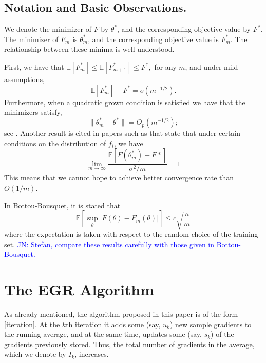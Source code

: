 \documentclass[11pt]{article}
\begin{document}
\subsection{Notation and Basic Observations.}
We denote the minimizer of $F$ by $\theta^*$, and the corresponding objective value by $F^*$.  
The minimizer of $F_m$ is $\theta^*_m$, and the corresponding objective value is $F^*_m$.  The relationship between these minima is well understood.

First, we have \cite[Proposition 10]{Kim:2015aa}  that 
$
         \mathbb{E} [F^*_m] \leq \mathbb{E} [F^*_{m+1}] \leq F^* ,
$
for any $m$, and under mild assumptions,
\[
         \mathbb{E} [ F^*_m ]-F^* = o(m^{-1/2}).
 \]
Furthermore, when a quadratic grown condition is satisfied we have that the minimizers satisfy,
\[ 
        \| \theta^*_m-\theta^*\| = O_p(m^{-1/2});
 \]
see \cite[Theorem 12]{Kim:2015aa}. Another result is cited in papers such as \cite{Frostig:2014aa} that state that under certain conditions on the distribution of $f_i$, we have 
\begin{equation}  \label{inc}
	\lim_{m \rightarrow \infty} \frac{\mathbb{E} \left[ F(\theta^*_m) - F*  \right] }{\sigma^2/m} = 1
\end{equation}
This means that we cannot hope to achieve better convergence rate than $O(1/m)$.

In Bottou-Bousquet\cite{bottou-bousquet-2008b}, it is stated that 
\begin{equation}
	\mathbb{E} \left[ \sup_{\theta} | F(\theta) - F_m(\theta) | \right] \leq c \sqrt{\frac{n}{m}}
\end{equation}
where the expectation is taken with respect to the random choice of the training set. 
\textcolor{blue}{JN: Stefan, compare these results carefully with those given in Bottou-Bousquet.}





\section{The EGR Algorithm}


As already mentioned, the algorithm proposed in this paper is of the form \eqref{iteration}. At the $k$th iteration it adds some (say, $u_k$) new sample gradients to the running average, and at the same time, updates some (say, $s_k$) of the gradients previously stored. Thus, the total number of  gradients in the average, which we denote by $I_k$, increases. 
\end{document}
